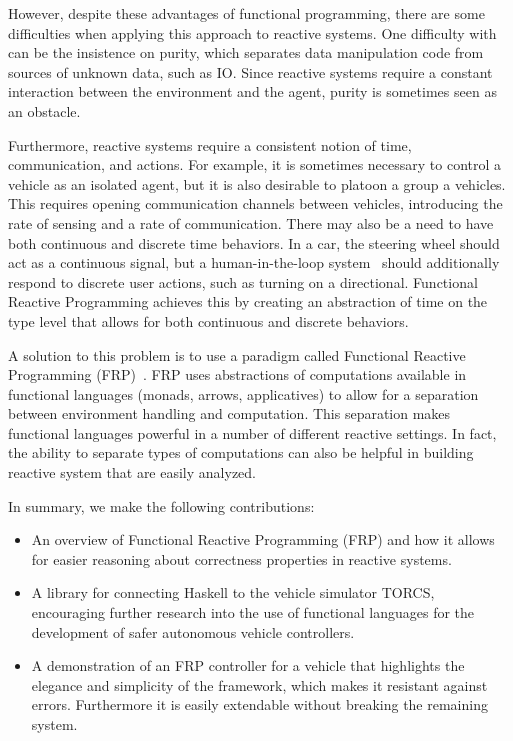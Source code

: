 However, despite these advantages of functional programming, there are some difficulties when applying this approach to reactive systems.
One difficulty with can be the insistence on purity, which separates data manipulation code from sources of unknown data, such as IO.
Since reactive systems require a constant interaction between the environment and the agent, purity is sometimes seen as an obstacle.

Furthermore, reactive systems require a consistent notion of time, communication, and actions.
For example, it is sometimes necessary to control a vehicle as an isolated agent, but it is also desirable to platoon a group a vehicles.
This requires opening communication channels between vehicles, introducing the rate of sensing and a rate of communication.
There may also be a need to have both continuous and discrete time behaviors.
In a car, the steering wheel should act as a continuous signal, but a human-in-the-loop system~\cite{li2014synthesis} should additionally respond to discrete user actions, such as turning on a directional.
Functional Reactive Programming achieves this by creating an abstraction of time on the type level that allows for both continuous and discrete behaviors.

A solution to this problem is to use a paradigm called Functional Reactive Programming (FRP)~\cite{hudak2003arrows,hudak2000haskell}.
FRP uses abstractions of computations available in functional languages (\eg monads, arrows, applicatives) to allow for a separation between environment handling and computation.
This separation makes functional languages powerful in a number of different reactive settings.
In fact, the ability to separate types of computations can also be helpful in building reactive system that are easily analyzed.


In summary, we make the following contributions:

\begin{itemize}
\item An overview of Functional Reactive Programming (FRP) and how it allows for easier reasoning about correctness properties in reactive systems. 

\item A library for connecting Haskell to the vehicle simulator TORCS, encouraging further research into the use of functional languages for the development of safer autonomous vehicle controllers.

\item A demonstration of an FRP controller for a vehicle that highlights the elegance and simplicity of the framework,
   which makes it resistant against errors. Furthermore it is easily extendable without breaking the remaining system.

\end{itemize}

